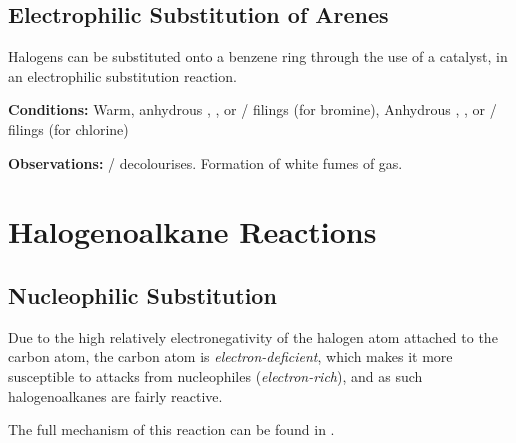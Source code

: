 		\subsection{Electrophilic Substitution of Arenes}

			Halogens can be substituted onto a benzene ring through the use of a catalyst, in an electrophilic substitution reaction.

			\vspace{1.5em}
			\vbox{\textbf{Conditions:}	\tabto{35mm}Warm, anhydrous , , or  /
										\ch{\aluminium} filings (for bromine),
										\tabto{35mm}Anhydrous , , or
													 / \ch{\aluminium} filings (for chlorine)}

			\vspace{0.75em}
			\vbox{\textbf{Observations:}\tabto{35mm}  /
										  decolourises.
										\tabto{35mm}Formation of white fumes of  gas.}


	\pagebreak
	\section{Halogenoalkane Reactions}

		\subsection{Nucleophilic Substitution}

			Due to the high relatively electronegativity of the halogen atom attached to the carbon atom, the carbon atom is
			\textit{electron-deficient}, which makes it more susceptible to attacks from nucleophiles (\textit{electron-rich}), and
			as such halogenoalkanes are fairly reactive.

			The full mechanism of this reaction can be found in \hyperlink{AppendixNucleophilicSubstitution}{}.

